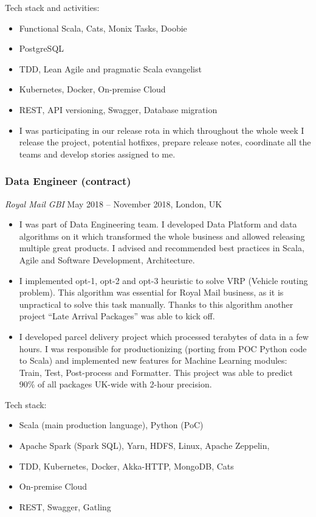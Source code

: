 \documentclass[]{rss}
\providecommand{\tightlist}{%
  \setlength{\itemsep}{0pt}\setlength{\parskip}{0pt}}
\begin{document}
\begin{resume}
Tech stack and activities:

\begin{itemize}
\tightlist
\item
  Functional Scala, Cats, Monix Tasks, Doobie
\item
  PostgreSQL
\item
  TDD, Lean Agile and pragmatic Scala evangelist
\item
  Kubernetes, Docker, On-premise Cloud
\item
  REST, API versioning, Swagger, Database migration
\item
  I was participating in our release rota in which throughout the whole
  week I release the project, potential hotfixes, prepare release notes,
  coordinate all the teams and develop stories assigned to me.
\end{itemize}

\subsubsection{Data Engineer (contract)}\label{data-engineer-contract}

\emph{Royal Mail \textbar{} GBI} May 2018 -- November 2018, London, UK

\begin{itemize}
\item
  I was part of Data Engineering team. I developed Data Platform and
  data algorithms on it which transformed the whole business and allowed
  releasing multiple great products. I advised and recommended best
  practices in Scala, Agile and Software Development, Architecture.
\item
  I implemented opt-1, opt-2 and opt-3 heuristic to solve VRP (Vehicle
  routing problem). This algorithm was essential for Royal Mail
  business, as it is unpractical to solve this task manually. Thanks to
  this algorithm another project ``Late Arrival Packages'' was able to
  kick off.
\item
  I developed parcel delivery project which processed terabytes of data
  in a few hours. I was responsible for productionizing (porting from
  POC Python code to Scala) and implemented new features for Machine
  Learning modules: Train, Test, Post-process and Formatter. This
  project was able to predict 90\% of all packages UK-wide with 2-hour
  precision.
\end{itemize}

Tech stack:

\begin{itemize}
\tightlist
\item
  Scala (main production language), Python (PoC)
\item
  Apache Spark (Spark SQL), Yarn, HDFS, Linux, Apache Zeppelin,
\item
  TDD, Kubernetes, Docker, Akka-HTTP, MongoDB, Cats
\item
  On-premise Cloud
\item
  REST, Swagger, Gatling
\end{itemize}


\end{resume}
\end{document}
